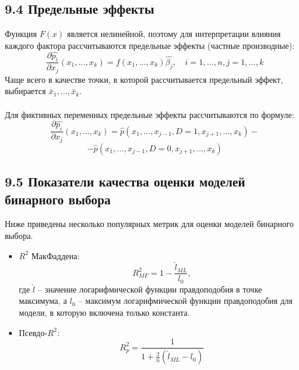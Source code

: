 \documentclass[a0,final]{a0poster}
\begin{document}
\begin{multicols}{4}
\subsection*{9.4 Предельные эффекты}
Функция $F(x)$ является нелинейной, поэтому для интерпретации влияния каждого фактора рассчитываются предельные эффекты (частные производные):\\
$$\frac{\partial\hat{p_i}}{\partial x_j}(x_1, ..., x_k) = f(x_1, ..., x_k)\hat{\beta_j}, \quad i = 1, ..., n, j = 1, ..., k$$
Чаще всего в качестве точки, в которой рассчитывается предельный эффект, выбирается $\bar{x}_1, ..., \bar{x}_k$.\\
\\
Для фиктивных переменных предельные эффекты рассчитываются по формуле:\\
$$\frac{\partial\hat{p_i}}{\partial x_j}(x_1, ..., x_k) = \hat{p}(x_1, ..., x_{j-1}, D = 1, x_{j+1}, ..., x_k) - $$
$$-\hat{p}(x_1, ..., x_{j-1}, D = 0, x_{j+1}, ..., x_k)$$

\subsection*{9.5 Показатели качества оценки моделей бинарного выбора}
Ниже приведены несколько популярных метрик для оценки моделей бинарного выбора.\\
\begin{itemize}
\item $R^2$ МакФаддена:
$$R^2_{MF} = 1 - \frac{\hat{l}_{ML}}{l_0},$$
где $\hat{l}$ -- значение логарифмической функции правдоподобия в точке максимума, а $l_0$ -- максимум логарифмической функции правдоподобия для модели, в которую включена только константа.
\item Псевдо-$R^2$:
$$R^2_p = \frac{1}{1 + \frac{2}{n}(\hat{l}_{ML} - l_0)}$$
\end{itemize}


\end{multicols}
\end{document}
